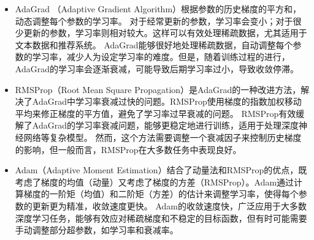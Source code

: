  \begin{itemize}
\item AdaGrad （Adaptive Gradient Algorithm）根据参数的历史梯度的平方和，动态调整每个参数的学习率。 对于经常更新的参数，学习率会变小；对于很少更新的参数，学习率则相对较大。这样可以有效处理稀疏数据，尤其适用于文本数据和推荐系统。
AdaGrad能够很好地处理稀疏数据，自动调整每个参数的学习率，减少人为设定学习率的难度。但是，随着训练过程的进行，AdaGrad的学习率会逐渐衰减，可能导致后期学习率过小，导致收敛停滞。
\item RMSProp（Root Mean Square Propagation）是AdaGrad的一种改进方法，解决了AdaGrad中学习率衰减过快的问题。RMSProp使用梯度的指数加权移动平均来修正梯度的平方值，避免了学习率过早衰减的问题。
RMSProp有效缓解了AdaGrad的学习率衰减问题，能够更稳定地进行训练，适用于处理深度神经网络等复杂模型。
然而，这个方法需要调整一个衰减因子来控制历史梯度的影响，但一般而言，RMSProp在大多数任务中表现良好。
\item Adam（Adaptive Moment Estimation）结合了动量法和RMSProp的优点，既考虑了梯度的均值（动量）又考虑了梯度的方差（RMSProp）。Adam通过计算梯度的一阶矩（均值）和二阶矩（方差）的估计来调整学习率，使得每个参数的更新更为精准，收敛速度更快。  Adam的收敛速度快，广泛应用于大多数深度学习任务，能够有效应对稀疏梯度和不稳定的目标函数，但有时可能需要手动调整部分超参数，如学习率和衰减率。
\end{itemize}

